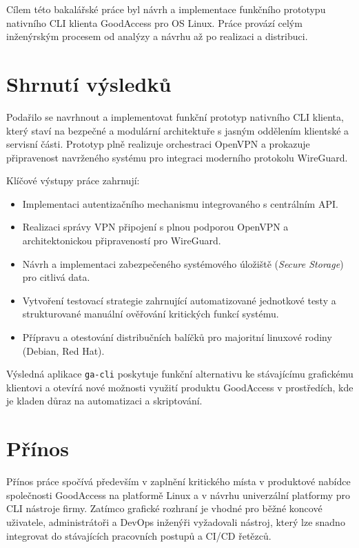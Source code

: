 \label{chap:zaver}

Cílem této bakalářské práce byl návrh a implementace funkčního prototypu nativního CLI klienta GoodAccess pro OS Linux. Práce provází celým inženýrským procesem od analýzy a návrhu až po realizaci a distribuci.

\section*{Shrnutí výsledků}

Podařilo se navrhnout a implementovat funkční prototyp nativního CLI klienta, který staví na bezpečné a modulární architektuře s jasným oddělením klientské a servisní části. Prototyp plně realizuje orchestraci OpenVPN a prokazuje připravenost navrženého systému pro integraci moderního protokolu WireGuard.

Klíčové výstupy práce zahrnují:
\begin{itemize}
    \item Implementaci autentizačního mechanismu integrovaného s centrálním API.
    \item Realizaci správy VPN připojení s plnou podporou OpenVPN a architektonickou připraveností pro WireGuard.
    \item Návrh a implementaci zabezpečeného systémového úložiště (\textit{Secure Storage}) pro citlivá data.
    \item Vytvoření testovací strategie zahrnující automatizované jednotkové testy a strukturované manuální ověřování kritických funkcí systému.
    \item Přípravu a otestování distribučních balíčků pro majoritní linuxové rodiny (Debian, Red Hat).
\end{itemize}

Výsledná aplikace \texttt{ga-cli} poskytuje funkční alternativu ke stávajícímu grafickému klientovi a otevírá nové možnosti využití produktu GoodAccess v prostředích, kde je kladen důraz na automatizaci a skriptování.

\section*{Přínos}

Přínos práce spočívá především v zaplnění kritického místa v produktové nabídce společnosti GoodAccess na platformě Linux a v návrhu univerzální platformy pro CLI nástroje firmy. Zatímco grafické rozhraní je vhodné pro běžné koncové uživatele, administrátoři a DevOps inženýři vyžadovali nástroj, který lze snadno integrovat do stávajících pracovních postupů a CI/CD řetězců.

